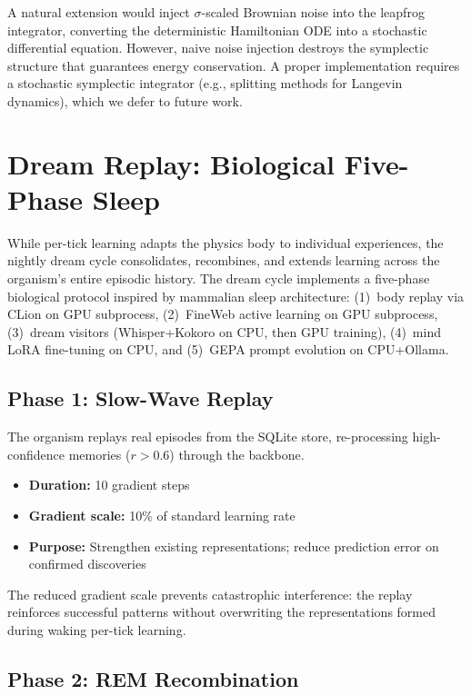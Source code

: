 \documentclass[11pt,a4paper,twocolumn]{article}
\begin{document}
A natural extension would inject $\sigma$-scaled Brownian noise into the leapfrog integrator, converting the deterministic Hamiltonian ODE into a stochastic differential equation.
However, naive noise injection destroys the symplectic structure that guarantees energy conservation.
A proper implementation requires a stochastic symplectic integrator (e.g., splitting methods for Langevin dynamics), which we defer to future work.

\section{Dream Replay: Biological Five-Phase Sleep}
\label{sec:dream_replay}

While per-tick learning adapts the physics body to individual experiences, the nightly dream cycle consolidates, recombines, and extends learning across the organism's entire episodic history.
The dream cycle implements a five-phase biological protocol inspired by mammalian sleep architecture:
(1)~body replay via CLion on GPU subprocess,
(2)~FineWeb active learning on GPU subprocess,
(3)~dream visitors (Whisper+Kokoro on CPU, then GPU training),
(4)~mind LoRA fine-tuning on CPU, and
(5)~GEPA prompt evolution on CPU+Ollama.

\subsection{Phase 1: Slow-Wave Replay}

The organism replays real episodes from the SQLite store, re-processing high-confidence memories ($r > 0.6$) through the backbone.
\begin{itemize}
\item \textbf{Duration:} 10 gradient steps
\item \textbf{Gradient scale:} 10\% of standard learning rate
\item \textbf{Purpose:} Strengthen existing representations; reduce prediction error on confirmed discoveries
\end{itemize}
The reduced gradient scale prevents catastrophic interference: the replay reinforces successful patterns without overwriting the representations formed during waking per-tick learning.

\subsection{Phase 2: REM Recombination}
\end{document}
